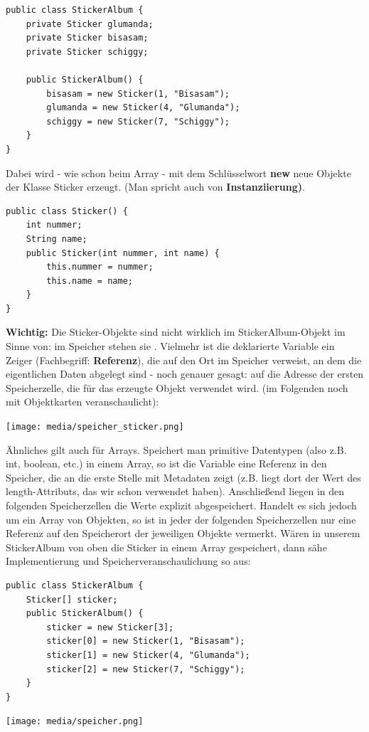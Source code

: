 \documentclass[fontsize=12pt]{article}
\begin{document}
\begin{verbatim}
public class StickerAlbum {
    private Sticker glumanda;
    private Sticker bisasam;
    private Sticker schiggy;

    public StickerAlbum() {
        bisasam = new Sticker(1, "Bisasam");
        glumanda = new Sticker(4, "Glumanda");
        schiggy = new Sticker(7, "Schiggy");
    }
}
\end{verbatim}
Dabei wird - wie schon beim Array - mit dem Schlüsselwort \textbf{new} neue Objekte der Klasse Sticker erzeugt. (Man spricht auch von \textbf{Instanziierung)}. \\
\begin{verbatim}
public class Sticker() {
    int nummer;
    String name;
    public Sticker(int nummer, int name) {
        this.nummer = nummer;
        this.name = name;
    }
}
\end{verbatim}
\vspace{2mm}
\textbf{Wichtig:} Die Sticker-Objekte sind nicht wirklich im StickerAlbum-Objekt  im Sinne von: im Speicher stehen sie . Vielmehr ist die deklarierte Variable ein Zeiger (Fachbegriff: \textbf{Referenz}), die auf den Ort im Speicher verweist, an dem die eigentlichen Daten abgelegt sind - noch genauer gesagt: auf die Adresse der ersten Speicherzelle, die für das erzeugte Objekt verwendet wird. (im Folgenden noch mit Objektkarten veranschaulicht): \\
\begin{center}
    \texttt{[image: media/speicher\_sticker.png]}
\end{center}
Ähnliches gilt auch für Arrays. Speichert man primitive Datentypen (also z.B. int, boolean, etc.) in einem Array, so ist die Variable eine Referenz in den Speicher, die an die erste Stelle mit Metadaten zeigt (z.B. liegt dort der Wert des length-Attributs, das wir schon verwendet haben). Anschließend liegen in den folgenden Speicherzellen die Werte explizit abgespeichert. Handelt es sich jedoch um ein Array von Objekten, so ist in jeder der folgenden Speicherzellen nur eine Referenz auf den Speicherort der jeweiligen Objekte vermerkt.
Wären in unserem StickerAlbum von oben die Sticker in einem Array gespeichert, dann sähe Implementierung und Speicherveranschaulichung so aus: 
\begin{verbatim}
public class StickerAlbum {
    Sticker[] sticker;
    public StickerAlbum() {
        sticker = new Sticker[3];
        sticker[0] = new Sticker(1, "Bisasam");
        sticker[1] = new Sticker(4, "Glumanda");
        sticker[2] = new Sticker(7, "Schiggy");
    }
}
\end{verbatim}
\begin{center}
    \texttt{[image: media/speicher.png]}
\end{center}
\newpage
\end{document}
